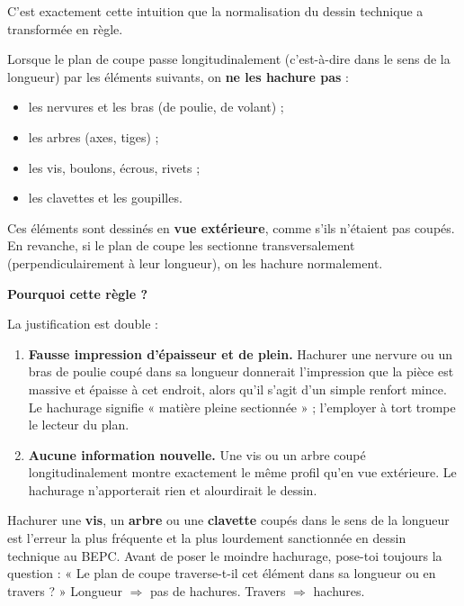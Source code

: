 \documentclass[11pt]{article}
\newcommand{\cle}[1]{{\popxbold\color{popdark}#1}}
\begin{document}
C'est exactement cette intuition que la normalisation du dessin technique a transformée en règle.

\begin{propriete}
Lorsque le plan de coupe passe \cle{longitudinalement} (c'est-à-dire dans le sens de la longueur) par les éléments suivants, on \textbf{ne les hachure pas} :
\begin{itemize}
\item les \cle{nervures} et les \cle{bras} (de poulie, de volant) ;
\item les \cle{arbres} (axes, tiges) ;
\item les \cle{vis}, \cle{boulons}, \cle{écrous}, \cle{rivets} ;
\item les \cle{clavettes} et les \cle{goupilles}.
\end{itemize}
Ces éléments sont dessinés en \textbf{vue extérieure}, comme s'ils n'étaient pas coupés. En revanche, si le plan de coupe les sectionne \cle{transversalement} (perpendiculairement à leur longueur), on les hachure normalement.
\end{propriete}

\textbf{Pourquoi cette règle ?}\par

La justification est double :
\begin{enumerate}
\item \textbf{Fausse impression d'épaisseur et de plein.} Hachurer une nervure ou un bras de poulie coupé dans sa longueur donnerait l'impression que la pièce est massive et épaisse à cet endroit, alors qu'il s'agit d'un simple renfort mince. Le hachurage signifie « matière pleine sectionnée » ; l'employer à tort trompe le lecteur du plan.
\item \textbf{Aucune information nouvelle.} Une vis ou un arbre coupé longitudinalement montre exactement le même profil qu'en vue extérieure. Le hachurage n'apporterait rien et alourdirait le dessin.
\end{enumerate}

\begin{attention}
Hachurer une \textbf{vis}, un \textbf{arbre} ou une \textbf{clavette} coupés dans le sens de la longueur est l'erreur la plus fréquente et la plus lourdement sanctionnée en dessin technique au BEPC. Avant de poser le moindre hachurage, pose-toi toujours la question : « Le plan de coupe traverse-t-il cet élément dans sa longueur ou en travers ? » Longueur $\Rightarrow$ pas de hachures. Travers $\Rightarrow$ hachures.
\end{attention}
\end{document}
